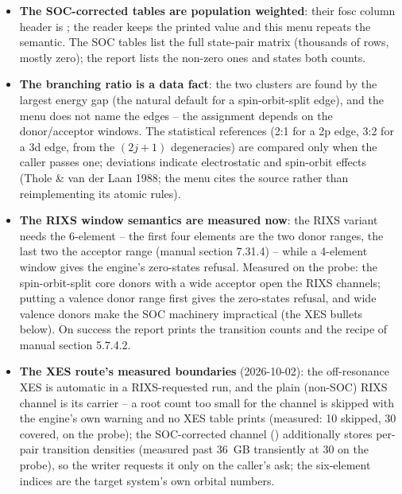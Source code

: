 \begin{readbox}
\begin{itemize}
  \item \textbf{The SOC-corrected tables are population weighted}: their
    fosc column header is ; the reader keeps
    the printed value and this menu repeats the semantic.  The SOC tables
    list the full state-pair matrix (thousands of rows, mostly zero); the
    report lists the non-zero ones and states both counts.
  \item \textbf{The branching ratio is a data fact}: the two clusters are
    found by the largest energy gap (the natural default for a
    spin-orbit-split edge), and the menu does not name the edges -- the
    assignment depends on the donor/acceptor windows.  The statistical
    references (2:1 for a 2p edge, 3:2 for a 3d edge, from the
    $(2j+1)$ degeneracies) are compared only when the caller passes one;
    deviations indicate electrostatic and spin-orbit effects
    (Thole \& van der Laan 1988; the menu cites the source rather than
    reimplementing its atomic rules).
  \item \textbf{The RIXS window semantics are measured now}: the RIXS
    variant needs the 6-element  -- the first four elements
    are the two donor ranges, the last two the acceptor range (manual
    section 7.31.4) -- while a 4-element window gives the engine's
    zero-states refusal.  Measured on the probe: the spin-orbit-split
    core donors  with a wide acceptor open the RIXS
    channels; putting a valence donor range first gives the zero-states
    refusal, and wide valence donors make the SOC machinery impractical
    (the XES bullets below).  On success the report prints the transition
    counts and the  recipe of manual section
    5.7.4.2.
  \item \textbf{The XES route's measured boundaries} (2026-10-02): the
    off-resonance XES is automatic in a RIXS-requested run, and the plain
    (non-SOC) RIXS channel is its carrier -- a root count too small for
    the channel is skipped with the engine's own warning and no XES table
    prints (measured:  10 skipped, 30 covered, on the
     probe); the SOC-corrected channel
    () additionally stores per-pair transition densities
    (measured past 36~GB transiently at  30 on the probe),
    so the writer requests it only on the caller's ask; the six-element
     indices are the target system's own orbital numbers.

\end{itemize}
\end{readbox}
